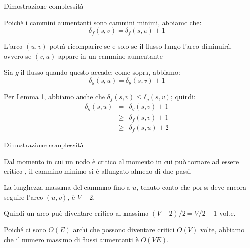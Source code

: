 \begin{frame}{Dimostrazione complessità}

\BIL
\item Poiché i cammini aumentanti sono cammini minimi, abbiamo che:
\[
 \delta_f(s,v) = \delta_f(s,u)+1
\]
\item L'arco $(u,v)$ potrà ricomparire se e solo se il flusso lungo l'arco 
diminuirà, ovvero se $(v,u)$ appare in un cammino aumentante
\item  Sia $g$ il flusso quando questo accade; come sopra, abbiamo:
\[
 \delta_{g}(s,u) = \delta_{g}(s,v)+1
\]
\item Per Lemma 1, abbiamo anche che $\delta_f(s,v)
\leq \delta_{g}(s,v)$; quindi:
\begin{eqnarray*}
\delta_{g}(s,u) &=& \delta_{g}(s,v)+1 \\
  & \geq & \delta_f(s,v) + 1 \\
  & \geq & \delta_f(s,u) + 2
\end{eqnarray*}
\EIL

\end{frame}

\begin{frame}{Dimostrazione complessità}

\BIL
\item Dal momento in cui un nodo è critico al momento in cui può tornare ad essere critico , il cammino minimo si è allungato almeno di due passi.
\item La lunghezza massima del cammino fino a $u$, tenuto conto che poi si deve ancora seguire l'arco $(u,v)$,
è $V-2$. 
\item Quindi un arco può diventare critico al massimo $(V-2)/2 = V/2-1$ volte. 
\item Poiché ci sono $O(E)$ archi che possono diventare critici $O(V)$ volte,
abbiamo che il numero massimo di flussi aumentanti è $O(VE)$. 
\EIL

\end{frame}


